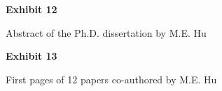 \documentclass{article}
\begin{document}
\vspace*{\fill}
\begin{center}

{\LARGE \bf
Exhibit 12
}

\vspace{10\baselineskip}

{\large Abstract of the Ph.D. dissertation by M.E. Hu}

\end{center}
\vspace*{\fill}


% 



\vspace*{\fill}
\begin{center}

{\LARGE \bf
Exhibit 13
}

\vspace{10\baselineskip}

{\large  First pages of 12 papers co-authored by M.E. Hu}

\end{center}
\vspace*{\fill}


% 

% 

% 

% 

% 

% 

% 

% 

% 

% 

% 
\end{document}
